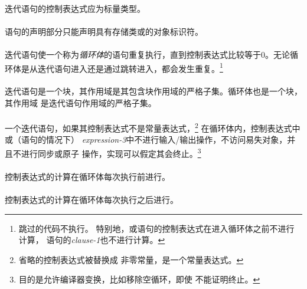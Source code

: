 {\constraint
\paragraph{}
迭代语句的控制表达式应为标量类型。

\paragraph{}
语句的声明部分只能声明具有存储类或的对象标识符。

\semantic
\paragraph{}
迭代语句使一个称为\textit{循环体}的语句重复执行，直到控制表达式比较等于0。无论循
环体是从迭代语句进入还是通过跳转进入，都会发生重复。\footnote{跳过的代码不执行。
特别地，或语句的控制表达式在进入循环体之前不进行计算，
语句的\textit{clause-1}也不进行计算。}

\paragraph{}
迭代语句是一个块，其作用域是其包含块作用域的严格子集。循环体也是一个块，其作用域
是迭代语句作用域的严格子集。

\paragraph{}
一个迭代语句，如果其控制表达式不是常量表达式，\footnote{省略的控制表达式被替换成
非零常量，是一个常量表达式。} 在循环体内，控制表达式中或（语句的情况下）
\textit{expression-3}中不进行输入/输出操作，不访问易失对象，并且不进行同步或原子
操作，实现可以假定其会终止。\footnote{目的是允许编译器变换，比如移除空循环，即使
不能证明终止。}

\paragraph{}
控制表达式的计算在循环体每次执行前进行。

\paragraph{}
控制表达式的计算在循环体每次执行之后进行。

}
